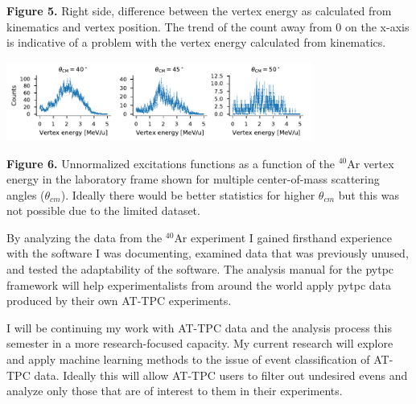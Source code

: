 \documentclass[a0paper,portrait]{baposter}
\begin{document}
\begin{poster}
{\small{\textbf{Figure 5.} Right side, difference between the vertex energy as calculated from kinematics and vertex position. The trend of the count away from 0 on the x-axis is indicative of a problem with the vertex energy calculated from kinematics.}

\begin{center}
\includegraphics [width=100mm] {angular_excitation_hists_POSTER.pdf}
\end{center}
\small{\textbf{Figure 6.} Unnormalized excitations functions as a function of the $^{40}$Ar vertex energy in the laboratory frame shown for multiple center-of-mass scattering angles ($\theta_{cm}$). Ideally there would be better statistics for higher $\theta_{cm}$ but this was not possible due to the limited dataset.}

}

{\small{ By analyzing the data from the $^{40}$Ar experiment I gained firsthand experience with the software I was documenting, examined data that was previously unused, and tested the adaptability of the software. The analysis manual for the pytpc framework will help experimentalists from around the world apply pytpc data produced by their own AT-TPC experiments.


I will be continuing my work with AT-TPC data and the analysis process this semester in a more research-focused capacity. My current research will explore and apply machine learning methods to the issue of event classification of AT-TPC data. Ideally this will allow AT-TPC users to filter out undesired evens and analyze only those that are of interest to them in their experiments. }
}
%
%
\end{poster}
\end{document}
